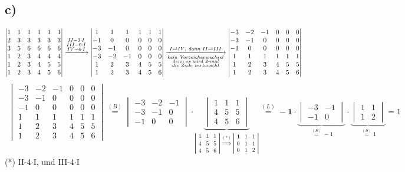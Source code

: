 \documentclass[titlepage]{article}
\newcommand{\1}{\mathbb{1}}
\newcommand{\0}{\mathbb{0}}
\newcommand{\detZ}[4]{\begin{vmatrix}#1&#2\\#3&#4\end{vmatrix}}
\newcommand{\detD}[9]{\begin{vmatrix}#1&#2&#3\\#4&#5&#6\\#7&#8&#9\end{vmatrix}}
\begin{document}
		\subsection*{c)}
			\begin{align*}
				\begin{vmatrix}
					1&1&1&1&1&1\\
					2&3&3&3&3&3\\
					3&5&6&6&6&6\\
					1&2&3&4&4&4\\
					1&2&3&4&5&5\\
					1&2&3&4&5&6
				\end{vmatrix}
				\xrightarrow{\substack{II-3\cdot I \\ III-6\cdot I \\ IV-4\cdot I}}
				\begin{vmatrix}
					1&1&1&1&1&1\\
					-1&0&0&0&0&0\\
					-3&-1&0&0&0&0\\
					-3&-2&-1&0&0&0\\
					1&2&3&4&5&5\\
					1&2&3&4&5&6
				\end{vmatrix}
				\xrightarrow[\substack{\text{\textit{kein Vorzeichenwechsel}} \\ \textit{denn es wird 2-mal} \\ \textit{die Zeile vertauscht}}]{I\rightleftarrows IV\text{\textit{, dann }}II\rightleftarrows III}
				\begin{vmatrix}
					-3&-2&-1&0&0&0\\
					-3&-1&0&0&0&0\\
					-1&0&0&0&0&0\\
					1&1&1&1&1&1\\
					1&2&3&4&5&5\\
					1&2&3&4&5&6
				\end{vmatrix}
			\end{align*}
			\begin{align*}
				\begin{vmatrix}
					-3&-2&-1&0&0&0\\
					-3&-1&0&0&0&0\\
					-1&0&0&0&0&0\\
					1&1&1&1&1&1\\
					1&2&3&4&5&5\\
					1&2&3&4&5&6
				\end{vmatrix}
				\overset{(B)}{=}\detD{-3}{-2}{-1}{-3}{-1}{0}{-1}{0}{0}\cdot\underbrace{\detD{1}{1}{1}{4}{5}{5}{4}{5}{6}}_{\left|\begin{smallmatrix}1&1&1\\4&5&5\\4&5&6\end{smallmatrix}\right|\overset{(*)}{\Rightarrow}\left|\begin{smallmatrix}\textbf{1}&1&1\\0&1&1\\0&1&2\end{smallmatrix}\right|}\overset{(L)}{=}-\textbf{1}\cdot\underbrace{\detZ{-3}{-1}{-1}{0}}_{\overset{(S)}{=}-1}\cdot\underbrace{\detZ{1}{1}{1}{2}}_{\overset{(S)}{=}1}=1
			\end{align*}
			(*) II-4$\cdot$I, und III-4$\cdot$I
\end{document}
